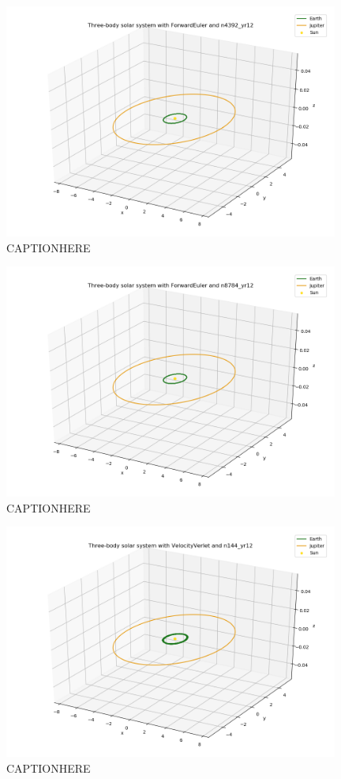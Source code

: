\documentclass{article}
\begin{document}
    \begin{figure}[H]
        \centering
        \includegraphics[width = 11cm]{img/plot3D_S_E_J_F_n4392_yr12.png}
        \caption{CAPTIONHERE}
        \label{fig:plot3D_S_E_J_F_n4392_yr12}
    \end{figure}

    \begin{figure}[H]
        \centering
        \includegraphics[width = 11cm]{img/plot3D_S_E_J_F_n8784_yr12.png}
        \caption{CAPTIONHERE}
        \label{fig:plot3D_S_E_J_F_n8784_yr12}
    \end{figure}

    \begin{figure}[H]
        \centering
        \includegraphics[width = 11cm]{img/plot3D_S_E_J_V_n144_yr12.png}
        \caption{CAPTIONHERE}
        \label{fig:plot3D_S_E_J_V_n144_yr12}
    \end{figure}
\end{document}
